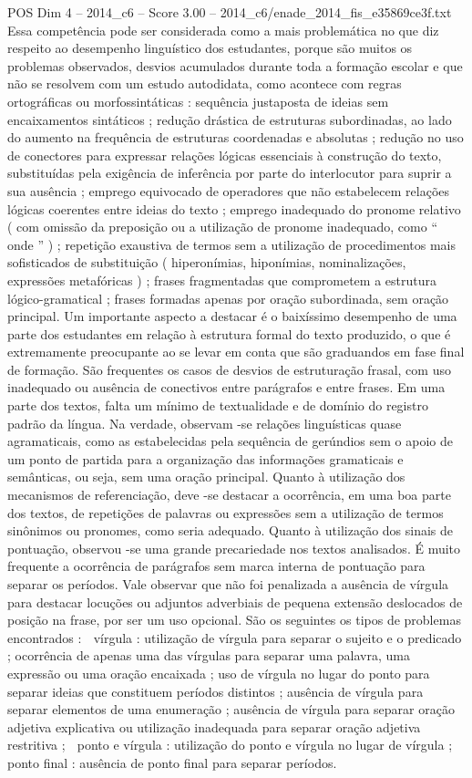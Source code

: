 \begin{textsample}{POS Dim 4 – 2014\_c6 – Score 3.00 – 2014\_c6/enade\_2014\_fis\_e35869ce3f.txt}
Essa competência pode ser considerada como a mais problemática no que diz respeito ao desempenho linguístico dos estudantes, porque são muitos os problemas observados, desvios acumulados durante toda a formação escolar e que não se resolvem com um estudo autodidata, como acontece com regras ortográficas ou morfossintáticas : sequência justaposta de ideias sem encaixamentos sintáticos ; redução drástica de estruturas subordinadas, ao lado do aumento na frequência de estruturas coordenadas e absolutas ; redução no uso de conectores para expressar relações lógicas essenciais à construção do texto, substituídas pela exigência de inferência por parte do interlocutor para suprir a sua ausência ; emprego equivocado de operadores que não estabelecem relações lógicas coerentes entre ideias do texto ; emprego inadequado do pronome relativo ( com omissão da preposição ou a utilização de pronome inadequado, como “ onde ” ) ; repetição exaustiva de termos sem a utilização de procedimentos mais sofisticados de substituição ( hiperonímias, hiponímias, nominalizações, expressões metafóricas ) ; frases fragmentadas que comprometem a estrutura lógico-gramatical ; frases formadas apenas por oração subordinada, sem oração principal.
Um importante aspecto a destacar é o baixíssimo desempenho de uma parte dos estudantes em relação à estrutura formal do texto produzido, o que é extremamente preocupante ao se levar em conta que são graduandos em fase final de formação.
São frequentes os casos de desvios de estruturação frasal, com uso inadequado ou ausência de conectivos entre parágrafos e entre frases.
Em uma parte dos textos, falta um mínimo de textualidade e de domínio do registro padrão da língua.
Na verdade, observam -se relações linguísticas quase agramaticais, como as estabelecidas pela sequência de gerúndios sem o apoio de um ponto de partida para a organização das informações gramaticais e semânticas, ou seja, sem uma oração principal.
Quanto à utilização dos mecanismos de referenciação, deve -se destacar a ocorrência, em uma boa parte dos textos, de repetições de palavras ou expressões sem a utilização de termos sinônimos ou pronomes, como seria adequado.
Quanto à utilização dos sinais de pontuação, observou -se uma grande precariedade nos textos analisados.
É muito frequente a ocorrência de parágrafos sem marca interna de pontuação para separar os períodos.
Vale observar que não foi penalizada a ausência de vírgula para destacar locuções ou adjuntos adverbiais de pequena extensão deslocados de posição na frase, por ser um uso opcional.
São os seguintes os tipos de problemas encontrados :  vírgula : utilização de vírgula para separar o sujeito e o predicado ; ocorrência de apenas uma das vírgulas para separar uma palavra, uma expressão ou uma oração encaixada ; uso de vírgula no lugar do ponto para separar ideias que constituem períodos distintos ; ausência de vírgula para separar elementos de uma enumeração ; ausência de vírgula para separar oração adjetiva explicativa ou utilização inadequada para separar oração adjetiva restritiva ;  ponto e vírgula : utilização do ponto e vírgula no lugar de vírgula ;  ponto final : ausência de ponto final para separar períodos.

\end{textsample}
